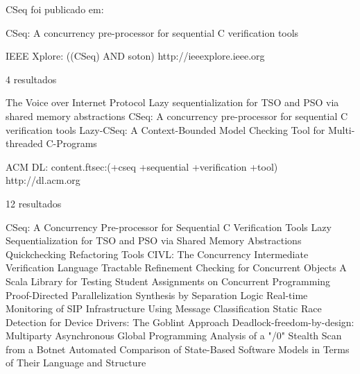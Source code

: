 CSeq foi publicado em:

CSeq: A concurrency pre-processor for sequential C verification tools

IEEE Xplore: ((CSeq) AND soton)
http://ieeexplore.ieee.org

4 resultados

The Voice over Internet Protocol
Lazy sequentialization for TSO and PSO via shared memory abstractions
CSeq: A concurrency pre-processor for sequential C verification tools
Lazy-CSeq: A Context-Bounded Model Checking Tool for Multi-threaded C-Programs

ACM DL: content.ftsec:(+cseq +sequential +verification +tool)
http://dl.acm.org

12 resultados

CSeq: A Concurrency Pre-processor for Sequential C Verification Tools
Lazy Sequentialization for TSO and PSO via Shared Memory Abstractions
Quickchecking Refactoring Tools
CIVL: The Concurrency Intermediate Verification Language
Tractable Refinement Checking for Concurrent Objects
A Scala Library for Testing Student Assignments on Concurrent Programming
Proof-Directed Parallelization Synthesis by Separation Logic
Real-time Monitoring of SIP Infrastructure Using Message Classification
Static Race Detection for Device Drivers: The Goblint Approach
Deadlock-freedom-by-design: Multiparty Asynchronous Global Programming
Analysis of a "/0" Stealth Scan from a Botnet
Automated Comparison of State-Based Software Models in Terms of Their Language and Structure
